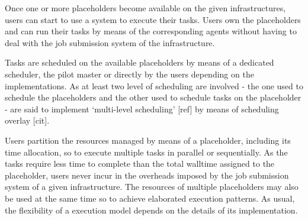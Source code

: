 \documentclass{sig-alternate}
\begin{document}
Once one or more placeholders become available on the given
infrastructures, users can start to use a \pilotjob system to execute
their tasks. Users own the placeholders and can run their tasks by
means of the corresponding agents without having to deal with the job
submission system of the infrastructure. 


Tasks are scheduled on the available placeholders by means of a
dedicated scheduler, the pilot master or directly by the users
depending on the \pilotjobs implementations. As at least two level of
scheduling are involved - the one used to schedule the placeholders
and the other used to schedule tasks on the placeholder - \pilotjobs
are said to implement `multi-level scheduling' [ref] by means of
scheduling overlay [cit].



Users partition the resources managed by means of a placeholder,
including its time allocation, so to execute multiple tasks in
parallel or sequentially. As the tasks require less time to complete
than the total walltime assigned to the placeholder, users never incur
in the overheads imposed by the job submission system of a given
infrastructure. The resources of multiple placeholders may also be
used at the same time so to achieve elaborated execution patterns. As
usual, the flexibility of a \pilotjob execution model depends on the
details of its implementation.


\end{document}
